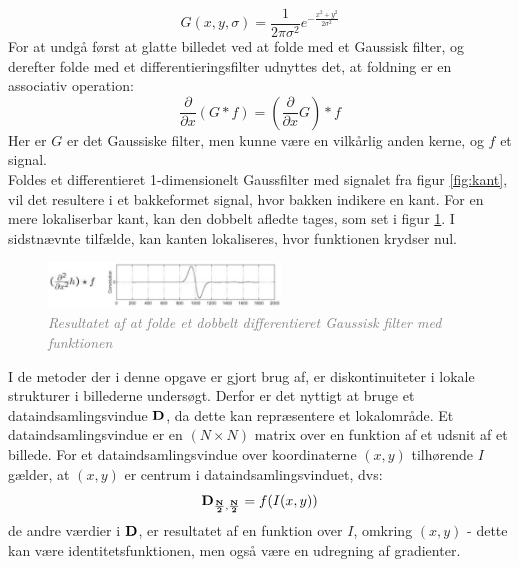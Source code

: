 \begin{equation}
G(x,y,\sigma) = \frac{1}{2 \pi \sigma ^{2}} e^{- \frac{x^{2} + y^{2}}{2 \sigma ^{2}}}
\label{2dgaussian}
\end{equation} 
For at undgå først at glatte billedet ved at folde med et Gaussisk filter, og derefter folde med et differentieringsfilter udnyttes det, at foldning er en associativ operation:
\begin{equation}
\dfrac{\partial}{\partial x}(G \ast f) = (\dfrac{\partial}{\partial x}G) \ast f
\end{equation}
Her er $G$ er det Gaussiske filter, men kunne være en vilkårlig anden kerne, og $f$ et signal. 
\\
Foldes et differentieret 1-dimensionelt Gaussfilter med signalet fra figur \ref{fig:kant}, vil det resultere i et bakkeformet signal, hvor bakken indikere en kant. For en mere lokaliserbar kant, kan den dobbelt afledte tages, som set i figur \ref{fig:deriv}. I sidstnævnte tilfælde, kan kanten lokaliseres, hvor funktionen krydser nul.
\begin{figure}[H]
    \centering
    \includegraphics[width=0.55\textwidth]{fig/8.png}
    \vspace{-1em}   
    \begin{center}
    \caption{\textcolor{gray}{\footnotesize \textit{
     Resultatet af at folde et dobbelt differentieret Gaussisk filter med funktionen}}}
    \label{fig:deriv}
     \end{center}
    \vspace{-2.5em}  
  \end{figure}
\noindent
I de metoder der i denne opgave er gjort brug af, er diskontinuiteter i lokale strukturer i billederne undersøgt. Derfor er det nyttigt at bruge et dataindsamlingsvindue $\bold{D}$, da dette kan repræsentere et lokalområde. Et dataindsamlingsvindue er en $(N\times N)$ matrix over en funktion af et udsnit af et billede. For et dataindsamlingsvindue over koordinaterne $(x,y)$ tilhørende $I$ gælder, at $(x,y)$ er centrum i dataindsamlingsvinduet, dvs:
$$
\bold{D_{\frac{N}{2},\frac{N}{2}}} = f(I(x,y))
$$
de andre værdier i $\bold{D}$, er resultatet af en funktion over $I$, omkring $(x,y)$ - dette kan være identitetsfunktionen, men også være en udregning af gradienter.
